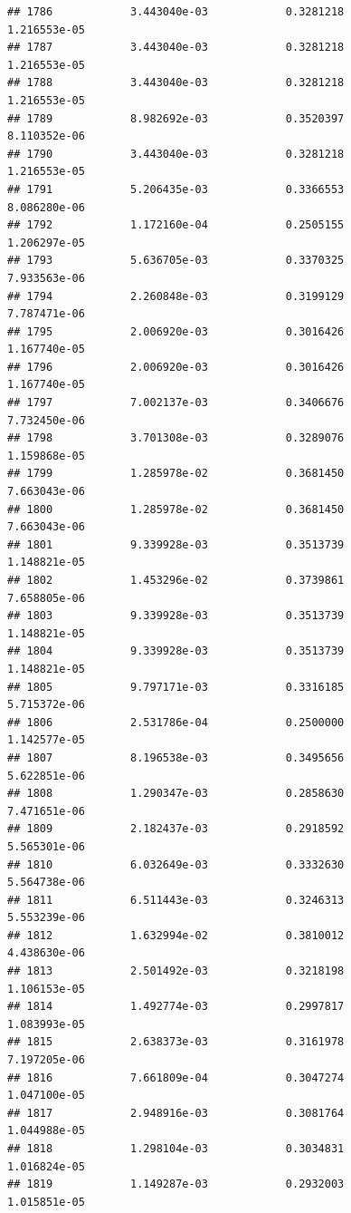 \documentclass[
]{article}
\begin{document}
\begin{verbatim}
## 1786            3.443040e-03            0.3281218            1.216553e-05
## 1787            3.443040e-03            0.3281218            1.216553e-05
## 1788            3.443040e-03            0.3281218            1.216553e-05
## 1789            8.982692e-03            0.3520397            8.110352e-06
## 1790            3.443040e-03            0.3281218            1.216553e-05
## 1791            5.206435e-03            0.3366553            8.086280e-06
## 1792            1.172160e-04            0.2505155            1.206297e-05
## 1793            5.636705e-03            0.3370325            7.933563e-06
## 1794            2.260848e-03            0.3199129            7.787471e-06
## 1795            2.006920e-03            0.3016426            1.167740e-05
## 1796            2.006920e-03            0.3016426            1.167740e-05
## 1797            7.002137e-03            0.3406676            7.732450e-06
## 1798            3.701308e-03            0.3289076            1.159868e-05
## 1799            1.285978e-02            0.3681450            7.663043e-06
## 1800            1.285978e-02            0.3681450            7.663043e-06
## 1801            9.339928e-03            0.3513739            1.148821e-05
## 1802            1.453296e-02            0.3739861            7.658805e-06
## 1803            9.339928e-03            0.3513739            1.148821e-05
## 1804            9.339928e-03            0.3513739            1.148821e-05
## 1805            9.797171e-03            0.3316185            5.715372e-06
## 1806            2.531786e-04            0.2500000            1.142577e-05
## 1807            8.196538e-03            0.3495656            5.622851e-06
## 1808            1.290347e-03            0.2858630            7.471651e-06
## 1809            2.182437e-03            0.2918592            5.565301e-06
## 1810            6.032649e-03            0.3332630            5.564738e-06
## 1811            6.511443e-03            0.3246313            5.553239e-06
## 1812            1.632994e-02            0.3810012            4.438630e-06
## 1813            2.501492e-03            0.3218198            1.106153e-05
## 1814            1.492774e-03            0.2997817            1.083993e-05
## 1815            2.638373e-03            0.3161978            7.197205e-06
## 1816            7.661809e-04            0.3047274            1.047100e-05
## 1817            2.948916e-03            0.3081764            1.044988e-05
## 1818            1.298104e-03            0.3034831            1.016824e-05
## 1819            1.149287e-03            0.2932003            1.015851e-05

\end{verbatim}
\end{document}
